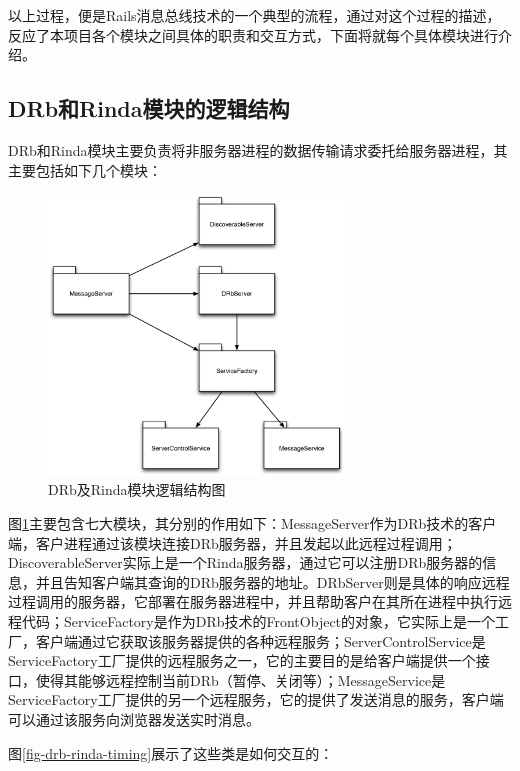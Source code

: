 以上过程，便是Rails消息总线技术的一个典型的流程，通过对这个过程的描述，反应了本项目各个模块之间具体的职责和交互方式，下面将就每个具体模块进行介绍。

\subsection{DRb和Rinda模块的逻辑结构}
DRb和Rinda模块主要负责将非服务器进程的数据传输请求委托给服务器进程，其主要包括如下几个模块：

\begin{figure}[h]
\centering
\includegraphics[width=0.7\textwidth]{images/overview/drb_rinda.eps}
\caption{DRb及Rinda模块逻辑结构图}
\label{fig-drb-rinda}
\end{figure}

图\ref{fig-drb-rinda}主要包含七大模块，其分别的作用如下：MessageServer作为DRb技术的客户端，客户进程通过该模块连接DRb服务器，并且发起以此远程过程调用；DiscoverableServer实际上是一个Rinda服务器，通过它可以注册DRb服务器的信息，并且告知客户端其查询的DRb服务器的地址。DRbServer则是具体的响应远程过程调用的服务器，它部署在服务器进程中，并且帮助客户在其所在进程中执行远程代码；ServiceFactory是作为DRb技术的FrontObject的对象，它实际上是一个工厂，客户端通过它获取该服务器提供的各种远程服务；ServerControlService是ServiceFactory工厂提供的远程服务之一，它的主要目的是给客户端提供一个接口，使得其能够远程控制当前DRb（暂停、关闭等）；MessageService是ServiceFactory工厂提供的另一个远程服务，它的提供了发送消息的服务，客户端可以通过该服务向浏览器发送实时消息。

图\ref{fig-drb-rinda-timing}展示了这些类是如何交互的：

